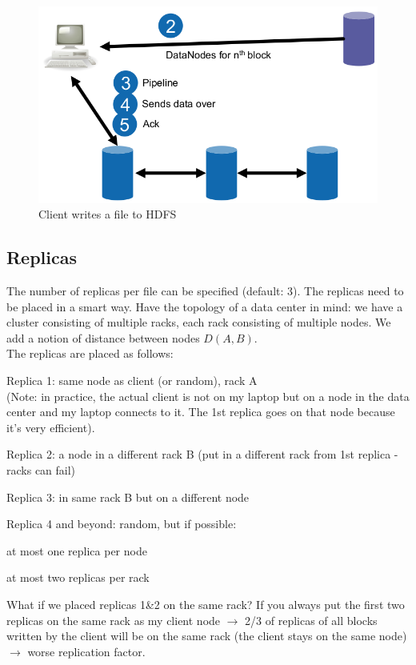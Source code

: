 \documentclass[11pt,oneside,a4paper]{article}
\begin{document}
\begin{figure}[t!]
	\centering
	\includegraphics[width=0.4\linewidth]{figures/hdfs_client_write}
	\caption{Client writes a file to HDFS}
	\label{fig:hdfsclientwrite}
\end{figure}

\newpage

\subsection{Replicas}

The number of replicas per file can be specified (default: 3). The replicas need to be placed in a smart way. Have the topology of a data center in mind: we have a cluster consisting of multiple racks, each rack consisting of multiple nodes. We add a notion of distance between nodes $D(A,B)$.\\
The replicas are placed as follows:

\begin{compactitem}
	\item Replica 1: same node as client (or random), rack A\\
	(Note: in practice, the actual client is not on my laptop but on a node in the data center and my laptop connects to it. The 1st replica goes on that node because it's very efficient).
	\item Replica 2: a node in a different rack B (put in a different rack from 1st replica - racks can fail)
	\item Replica 3: in same rack B but on a different node
	\item Replica 4 and beyond: random, but if possible:
	\begin{compactitem}
		\item at most one replica per node
		\item at most two replicas per rack\\
	\end{compactitem}
\end{compactitem}

What if we placed replicas 1\&2 on the same rack? If you always put the first two replicas on the same rack as my client node $\rightarrow$ 2/3 of replicas of all blocks written by the client will be on the same rack (the client stays on the same node) $\rightarrow$ worse replication factor.\\
\end{document}
